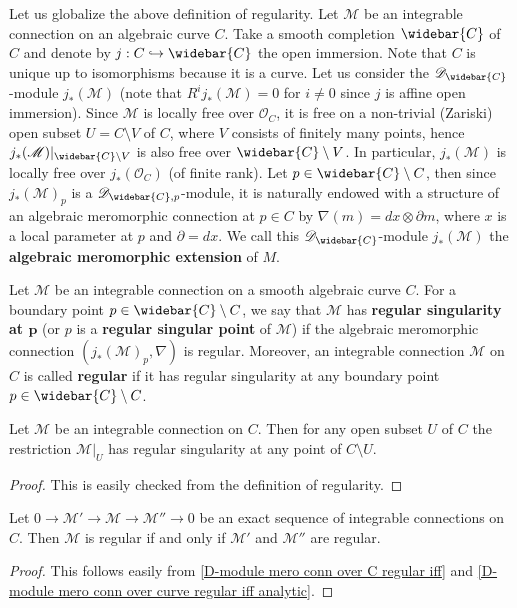 Let us globalize the above definition of regularity. Let $\mathscr{M}$ be an integrable connection on an algebraic curve $C$. Take a smooth completion $\widebar{C}$ of $C$ and denote by $j:C\hookrightarrow\widebar{C}$ the open immersion. Note that $C$ is unique up to isomorphisms because it is a curve. Let us consider the $\mathscr{D}_{\widebar{C}}$-module $j_*(\mathscr{M})$ (note that $R^ij_*(\mathscr{M})=0$ for $i\neq 0$ since $j$ is affine open immersion). Since $\mathscr{M}$ is locally free over $\mathscr{O}_C$, it is free on a non-trivial (Zariski) open subset $U=C\setminus V$ of $C$, where $V$ consists of finitely many points, hence $j_*(\mathscr{M})|_{\widebar{C}\setminus V}$ is also free over $\widebar{C}\setminus V$. In particular, $j_*(\mathscr{M})$ is locally free over $j_*(\mathscr{O}_C)$ (of finite rank). Let $p\in\widebar{C}\setminus C$, then since $j_*(\mathscr{M})_p$ is a $\mathscr{D}_{\widebar{C},p}$-module, it is naturally endowed with a structure of an algebraic meromorphic connection at $p\in C$ by $\nabla(m)=dx\otimes\partial m$, where $x$ is a local parameter at $p$ and $\partial=dx$. We call this $\mathscr{D}_{\widebar{C}}$-module $j_*(\mathscr{M})$ the \textbf{algebraic meromorphic extension} of $M$.
\begin{definition}
Let $\mathscr{M}$ be an integrable connection on a smooth algebraic curve $C$. For a boundary point $p\in\widebar{C}\setminus C$, we say that $\mathscr{M}$ has \textbf{regular singularity at $\bm{p}$} (or $p$ is a \textbf{regular singular point} of $\mathscr{M}$) if the algebraic meromorphic connection $(j_*(\mathscr{M})_p,\nabla)$ is regular. Moreover, an integrable connection $\mathscr{M}$ on $C$ is called \textbf{regular} if it has regular singularity at any boundary point $p\in\widebar{C}\setminus C$.
\end{definition}

\begin{proposition}\label{D-module integral connection on curve restriction regular}
Let $\mathscr{M}$ be an integrable connection on $C$. Then for any open subset $U$ of $C$ the restriction $\mathscr{M}|_U$ has regular singularity at any point of $C\setminus U$.
\end{proposition}
\begin{proof}
This is easily checked from the definition of regularity.
\end{proof}

\begin{proposition}\label{D-module integral connection on curve regular and exact sequence}
Let $0\to \mathscr{M}'\to \mathscr{M}\to \mathscr{M}''\to 0$ be an exact sequence of integrable connections on $C$. Then $\mathscr{M}$ is regular if and only if $\mathscr{M}'$ and $\mathscr{M}''$ are regular.
\end{proposition}
\begin{proof}
This follows easily from \cref{D-module mero conn over C regular iff} and \cref{D-module mero conn over curve regular iff analytic}.
\end{proof}

